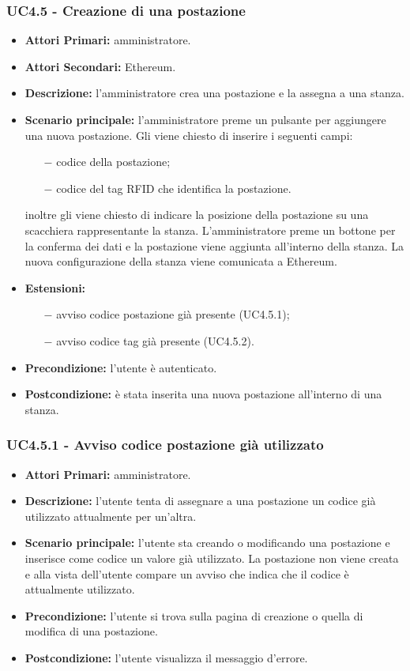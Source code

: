\subsubsection{UC4.5 - Creazione di una postazione}
\begin{itemize}
	\item\textbf{Attori Primari:}
	amministratore.
	\item\textbf{Attori Secondari:}
	Ethereum.
	\item\textbf{Descrizione:}
	l'amministratore crea una postazione e la assegna a una stanza.
	\item\textbf{Scenario principale:} 
	l'amministratore preme un pulsante per aggiungere una nuova postazione. Gli viene chiesto di inserire i seguenti campi:
	\begin{itemize}
		\item[$-$] codice della postazione;
		\item[$-$] codice del tag RFID che identifica la postazione.
	\end{itemize}
	inoltre gli viene chiesto di indicare la posizione della postazione su una scacchiera rappresentante la stanza.
	L'amministratore preme un bottone per la conferma dei dati e la postazione viene aggiunta all'interno della stanza. La nuova configurazione della stanza viene comunicata a Ethereum.
	\item\textbf{Estensioni:}
	\begin{itemize}
		\item[$-$] avviso codice postazione già presente (UC4.5.1);
		\item[$-$] avviso codice tag già presente (UC4.5.2).
	\end{itemize}
	\item\textbf{Precondizione:} 
	l'utente è autenticato.
	\item\textbf{Postcondizione:}
	è stata inserita una nuova postazione all'interno di una stanza.
\end{itemize}



\subsubsection{UC4.5.1 - Avviso codice postazione già utilizzato}
\begin{itemize}
	\item\textbf{Attori Primari:}
	amministratore.
	\item\textbf{Descrizione:}
	l'utente tenta di assegnare a una postazione un codice già utilizzato attualmente per un'altra.
	\item\textbf{Scenario principale:}
	l'utente sta creando o modificando una postazione e inserisce come codice un valore già utilizzato.
	La postazione non viene creata e alla vista dell'utente compare un avviso che indica che il codice è attualmente utilizzato.
	\item\textbf{Precondizione:}
	l'utente si trova sulla pagina di creazione o quella di modifica di una postazione.
	\item\textbf{Postcondizione:}
	l'utente visualizza il messaggio d'errore.
\end{itemize}

